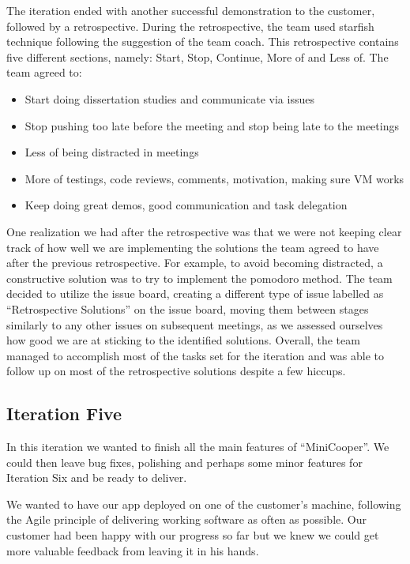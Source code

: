 \documentclass{l3proj}
\begin{document}
The iteration ended with another successful demonstration to the customer, followed by a retrospective. During the retrospective, the team used starfish technique following the suggestion of the team coach. This retrospective contains five different sections, namely: Start, Stop, Continue, More of and Less of. The team agreed to:

\begin{itemize}
\item Start doing dissertation studies and communicate via issues
\item Stop pushing too late before the meeting and stop being late to the meetings
\item Less of being distracted in meetings
\item More of testings, code reviews, comments, motivation, making sure VM works
\item Keep doing great demos, good communication and task delegation
\end{itemize}

One realization we had after the retrospective was that we were not keeping clear track of how well we are implementing the solutions the team agreed to have after the previous retrospective. For example, to avoid becoming distracted, a constructive solution was to try to implement the pomodoro method. The team decided to utilize the issue board, creating a different type of issue labelled as “Retrospective Solutions” on the issue board, moving them between stages similarly to any other issues on subsequent meetings, as we assessed ourselves how good we are at sticking to the identified solutions. Overall, the team managed to accomplish most of the tasks set for the iteration and was able to follow up on most of the retrospective solutions despite a few hiccups.


\subsection{Iteration Five}

In this iteration we wanted to finish all the main features of ``MiniCooper''. We could then leave bug fixes, polishing and perhaps some minor features for Iteration Six and be ready to deliver.

We wanted to have our app deployed on one of the customer’s machine, following the Agile principle of delivering working software as often as possible. Our customer had been happy with our progress so far but we knew we could get more valuable feedback from leaving it in his hands.  
\end{document}
